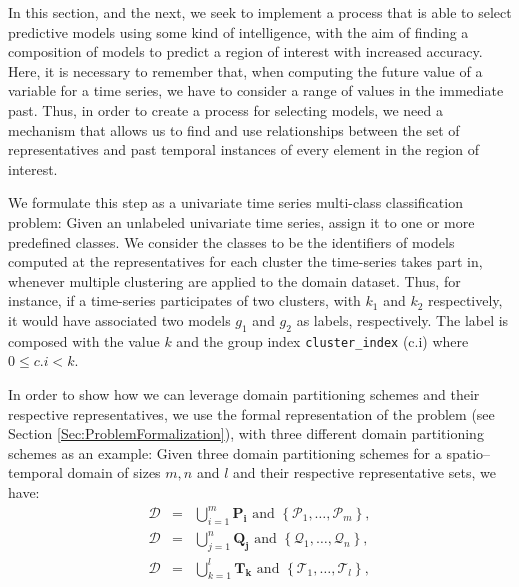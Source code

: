 
In this section, and the next, we seek to implement a process that is able to select predictive models using some kind of intelligence, with the aim of finding a composition of models to predict a region of interest with increased accuracy. Here, it is  necessary to remember that, when computing the future value of a variable for a time series, we have to consider a range of values in the immediate past. Thus, in order to create a process for selecting models, we need a mechanism that allows us to find and use relationships between the set of representatives and past temporal instances of every element in the region of interest. 

We formulate this step as a univariate time series multi-class classification problem: Given an unlabeled univariate time series, assign it to one or more predefined classes. We consider the classes to be the identifiers of models computed at the representatives for each cluster the time-series takes part in, whenever multiple clustering are applied to the domain dataset. Thus, for instance, if a time-series participates of two clusters, with $k_1$ and $k_2$ respectively, it would have associated two models $g_1$ and $g_2$ as labels, respectively.
The label is composed with the value $k$ and the group index \texttt{cluster\_index} (c.i) where $0 \leq c.i <k$. 

In order to show how we can leverage domain partitioning schemes and their respective representatives, we use the formal representation of the problem (see Section \ref{Sec:ProblemFormalization}), with three different domain partitioning schemes as an example: Given three domain partitioning schemes for a spatio--temporal domain of sizes $m, n$ and $l$ and their respective representative sets, we have:
\begin{eqnarray} 
\nonumber
\mathcal{D}	& = & \bigcup_{i=1}^{m} \mathbf{P_i} \,\,\textrm{and} \,\, \left\{\mathcal{P}_{1}, \ldots, \mathcal{P}_{m}\right\},  \\ \nonumber
\mathcal{D} & = & \bigcup_{j=1}^{n} \mathbf{Q_j} \,\,\textrm{and} \,\, \left\{\mathcal{Q}_{1}, \ldots, \mathcal{Q}_{n}\right\}, \\ \nonumber 
\mathcal{D} & = & \bigcup_{k=1}^{l} \mathbf{T_k} \,\,\textrm{and} \,\, \left\{\mathcal{T}_{1}, \ldots, \mathcal{T}_{l}\right\},
\end{eqnarray}

